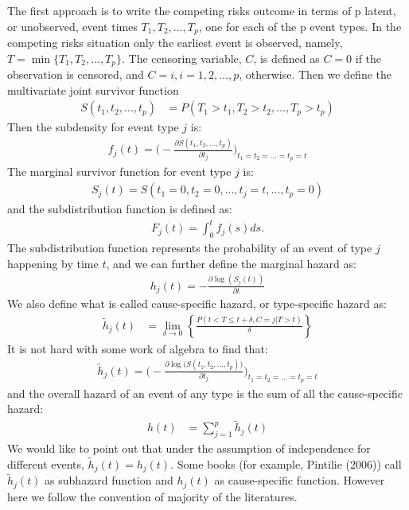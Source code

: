 \documentclass[times, doublespace]{simauth}
\begin{document}
The first approach is to write the competing risks outcome in terms of p latent, or unobserved, event times $T_1, T_2, \ldots, T_p$, one for each of the p event types\cite{pintilie06}. In the competing risks situation only the earliest  event is observed, namely, $T = \min\{T_1, T_2, \ldots, T_p\}$. The censoring variable, $C$, is defined as $C = 0$ if the observation is censored, and $C = i, i = 1, 2, \ldots, p$, otherwise. Then we define the multivariate joint survivor function
\begin{align*}
	S(t_1, t_2, \ldots, t_p) &= P(T_1 > t_1, T_2 > t_2, \ldots, T_p > t_p)
\end{align*}
Then the subdensity for event type $j$ is:
\begin{align*}
	f_j(t) = \Big(-\frac{\partial S(t_1, t_2, \ldots, t_p)}{\partial t_j}\Big)_{t_1 = t_2 = \ldots = t_p = t}
\end{align*}
The marginal survivor function for event type $j$ is:
\begin{align*}
	S_j(t) = S(t_1 = 0, t_2 = 0, \ldots, t_j = t, \ldots, t_p = 0)
\end{align*}
and the subdistribution function is defined as:
\begin{align*}
	F_j(t) = \int_0^t f_j(s)d s.
\end{align*}
The subdistribution function represents the probability of an event of type $j$ happening by time $t$, and we can further define the marginal hazard as:
\begin{align*}
	h_j(t) = -\frac{\partial \log(S_j(t))}{\partial t} 
\end{align*}
We also define what is called cause-specific hazard, or type-specific hazard as:
\begin{align*}
	\tilde{h}_j(t) &= \lim_{\delta \to 0}\left\{\frac{P(t < T \leq t + \delta, C = j|T> t)}{\delta}\right\}
\end{align*}
It is not hard with some work of algebra to find that:
\begin{align*}
	\tilde{h}_j(t) = \Big(-\frac{\partial \log\Big(S(t_1, t_2, \ldots, t_p)\Big)}{\partial t_j}\Big)_{t_1 = t_2 = \ldots = t_p = t}
\end{align*}
and the overall hazard of an event of any type is the sum of all the cause-specific hazard:
\begin{align*}
	h(t) &= \sum_{j = 1}^p\tilde{h}_j(t)
\end{align*}
We would like to point out that under the assumption of independence for different events, $\tilde{h}_j(t) = h_j(t)$. Some books (for example, Pintilie (2006)\cite{pintilie06}) call $\tilde{h}_j(t)$ as subhazard function and $h_j(t)$ as cause-specific function. However here we follow the convention of majority of the literatures\cite{Klein97}.
\end{document}
